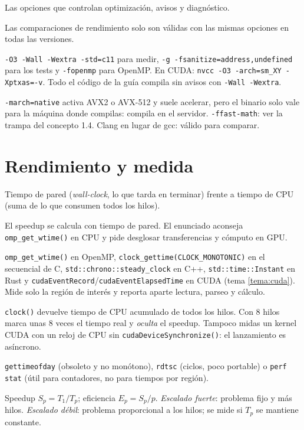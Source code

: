 \que Las opciones que controlan optimización, avisos y diagnóstico.

\porque Las comparaciones de rendimiento solo son válidas con las mismas opciones en todas las versiones.

\como \texttt{-O3 -Wall -Wextra -std=c11} para medir, \texttt{-g -fsanitize=address,undefined} para los tests y \texttt{-fopenmp} para OpenMP. En CUDA: \texttt{nvcc -O3 -arch=sm\_XY -Xptxas=-v}. Todo el código de la guía compila sin avisos con \texttt{-Wall -Wextra}.

\alt \texttt{-march=native} activa AVX2 o AVX-512 y suele acelerar, pero el binario solo vale para la máquina donde compilas: compila en el servidor. \texttt{-ffast-math}: ver la trampa del concepto 1.4. Clang en lugar de gcc: válido para comparar.

\section{Rendimiento y medida}\label{tema:rend}

\que Tiempo de pared (\emph{wall-clock}, lo que tarda en terminar) frente a tiempo de CPU (suma de lo que consumen todos los hilos).

\porque El speedup se calcula con tiempo de pared. El enunciado aconseja \texttt{omp\_get\_wtime()} en CPU y pide desglosar transferencias y cómputo en GPU.

\como \texttt{omp\_get\_wtime()} en OpenMP, \texttt{clock\_gettime(CLOCK\_MONOTONIC)} en el secuencial de C, \texttt{std::chrono::steady\_clock} en C++, \texttt{std::time::Instant} en Rust y \texttt{cudaEventRecord}/\texttt{cudaEventElapsedTime} en CUDA (tema \ref{tema:cuda}). Mide solo la región de interés y reporta aparte lectura, parseo y cálculo.

\begin{trampa}
\texttt{clock()} devuelve tiempo de CPU acumulado de todos los hilos. Con 8 hilos marca unas 8 veces el tiempo real y \emph{oculta} el speedup. Tampoco midas un kernel CUDA con un reloj de CPU sin \texttt{cudaDeviceSynchronize()}: el lanzamiento es asíncrono.
\end{trampa}

\alt \texttt{gettimeofday} (obsoleto y no monótono), \texttt{rdtsc} (ciclos, poco portable) o \texttt{perf stat} (útil para contadores, no para tiempos por región).

\que Speedup $S_p=T_1/T_p$; eficiencia $E_p=S_p/p$. \emph{Escalado fuerte}: problema fijo y más hilos. \emph{Escalado débil}: problema proporcional a los hilos; se mide si $T_p$ se mantiene constante.

